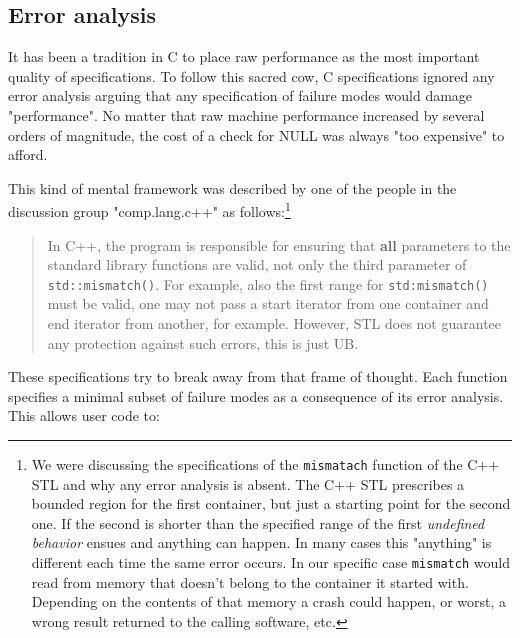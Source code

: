 \subsection{Error analysis}
It has been a  tradition in C to place raw performance as the most important quality of specifications. To follow this sacred cow, C specifications
ignored any error analysis arguing that any specification of failure modes would damage "performance". No matter that raw machine performance
increased by several orders of magnitude, the cost of  a check for NULL was always "too expensive" to afford.

This kind of mental framework was described by one of the people in the discussion group "comp.lang.c++" as follows:\footnote{We were discussing 
the specifications of the \texttt{mismatach} function of the C++ STL and why any error analysis is absent. The C++ STL prescribes a bounded 
region for the first container, but just a starting point for the second one. If the second is shorter than the specified range of the first
 \textsl{undefined behavior} ensues and anything can happen. In many cases this "anything" is different each time the same error occurs. In our
specific case \texttt{mismatch} would read from memory that doesn't belong to the container it started with. Depending on the contents of
that memory a crash could happen, or worst, a wrong result returned to the calling software, etc.}
\begin{quotation}
 In C++, the program is responsible for ensuring that \textbf{all} parameters to
 the standard library functions are valid, not only the third parameter of
 \texttt{std::mismatch()}. For example, also the first range for \texttt{std:mismatch()}
 must be valid, one may not pass a start iterator from one container and
 end iterator from another, for example. However, STL does not guarantee
 any protection against such errors, this is just UB.
\end{quotation}
These specifications try to break away from that frame of thought. Each function specifies a minimal subset of failure modes as a consequence of its 
error analysis. This allows user code to:
